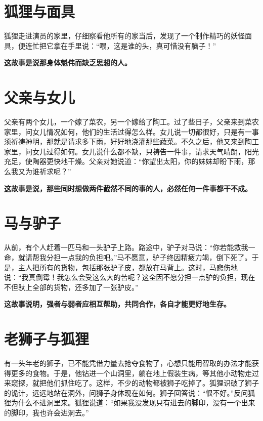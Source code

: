 \section{狐狸与面具}

狐狸走进演员的家里，仔细察看他所有的家当后，发现了一个制作精巧的妖怪面具，便连忙把它拿在手里说：“喂，这是谁的头，真可惜没有脑子！”

{\bfseries \color{red}这故事是说那身体魁伟而缺乏思想的人。}

\section{父亲与女儿}

父亲有两个女儿，一个嫁了菜农，另一个嫁给了陶工。过了些日子，父亲来到菜农家里，问女儿情况如何，他们的生活过得怎么样。女儿说一切都很好，只是有一事须祈祷神明，那就是请求多下雨，好好地浇灌那些蔬菜。不久之后，他又来到陶工家里，问女儿过得如何。女儿说什么都不缺，只祷告一件事，请求天气晴朗，阳光充足，使陶器更快地干燥。父亲对她说道：“你望出太阳，你的妹妹却盼下雨，那么我又为谁祈求呢？”

{\bfseries \color{red}这故事是说，那些同时想做两件截然不同的事的人，必然任何一件事都干不成。}

\section{马与驴子}

从前，有个人赶着一匹马和一头驴子上路。路途中，驴子对马说：“你若能救我一命，就请帮我分担一点我的负担吧。”马不愿意，驴子终因精疲力竭，倒下死了。于是，主人把所有的货物，包括那张驴子皮，都放在马背上。这时，马悲伤地说：“我真倒霉！我怎么会受这么大的苦呢？这全因不愿分担一点驴的负担，现在不但驮上全部的货物，还多加了一张驴皮。”

{\bfseries \color{red}这故事说明，强者与弱者应相互帮助，共同合作，各自才能更好地生存。}

\section{老狮子与狐狸}

有一头年老的狮子，已不能凭借力量去抢夺食物了，心想只能用智取的办法才能获得更多的食物。于是，他钻进一个山洞里，躺在地上假装生病，等其他小动物走过来窥探，就把他们抓住吃了。这样，不少的动物都被狮子吃掉了。狐狸识破了狮子的诡计，远远地站在洞外，问狮子身体现在如何。狮子回答说：“很不好。”反问狐狸为什么不进洞里来。狐狸说道：“如果我没发现只有进去的脚印，没有一个出来的脚印，我也许会进洞去。”

